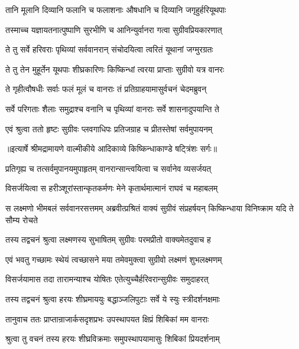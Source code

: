 \twolineshloka
{तानि मूलानि दिव्यानि फलानि च फलाशनाः}
{औषधानि च दिव्यानि जगृहुर्हरियूथपाः} %

\twolineshloka
{तस्माच्च यज्ञायतनात्पुष्पाणि सुरभीणि च}
{आनिन्युर्वानरा गत्वा सुग्रीवप्रियकारणात्} %

\twolineshloka
{ते तु सर्वे हरिवराः पृथिव्यां सर्ववानरान्}
{संचोदयित्वा त्वरितं यूथानां जग्मुरग्रतः} %

\twolineshloka
{ते तु तेन मुहूर्तेन यूथपाः शीघ्रकारिणः}
{किष्किन्धां त्वरया प्राप्ताः सुग्रीवो यत्र वानरः} %

\twolineshloka
{ते गृहीत्वौषधीः सर्वाः फलं मूलं च वानराः}
{तं प्रतिग्राहयामासुर्वचनं चेदमब्रुवन्} %

\twolineshloka
{सर्वे परिगताः शैलाः समुद्राश्च वनानि च}
{पृथिव्यां वानराः सर्वे शासनादुपयान्ति ते} %

\twolineshloka
{एवं श्रुत्वा ततो हृष्टः सुग्रीवः प्लवगाधिपः}
{प्रतिजग्राह च प्रीतस्तेषां सर्वमुपायनम्} %


{॥इत्यार्षे श्रीमद्रामायणे वाल्मीकीये आदिकाव्ये किष्किन्धाकाण्डे षट्त्रिंशः सर्गः॥}


\twolineshloka
{प्रतिगृह्य च तत्सर्वमुपानयमुपाहृतम्}
{वानरान्सान्त्वयित्वा च सर्वानेव व्यसर्जयत्} %

\twolineshloka
{विसर्जयित्वा स हरीञ्शूरांस्तान्कृतकर्मणः}
{मेने कृतार्थमात्मानं राघवं च महाबलम्} %

\threelineshloka
{स लक्ष्मणो भीमबलं सर्ववानरसत्तमम्}
{अब्रवीत्प्रश्रितं वाक्यं सुग्रीवं संप्रहर्षयन्}
{किष्किन्धाया विनिष्क्राम यदि ते सौम्य रोचते} %

\twolineshloka
{तस्य तद्वचनं श्रुत्वा लक्ष्मणस्य सुभाषितम्}
{सुग्रीवः परमप्रीतो वाक्यमेतदुवाच ह} %

\twolineshloka
{एवं भवतु गच्छामः स्थेयं त्वच्छासने मया}
{तमेवमुक्त्वा सुग्रीवो लक्ष्मणं शुभलक्ष्मणम्} %

\twolineshloka
{विसर्जयामास तदा तारामन्याश्च योषितः}
{एतेत्युच्चैर्हरिवरान्सुग्रीवः समुदाहरत्} %

\twolineshloka
{तस्य तद्वचनं श्रुत्वा हरयः शीघ्रमाययुः}
{बद्धाञ्जलिपुटाः सर्वे ये स्युः स्त्रीदर्शनक्षमाः} %

\twolineshloka
{तानुवाच ततः प्राप्तान्राजार्कसदृशप्रभः}
{उपस्थापयत क्षिप्रं शिबिकां मम वानराः} %

\twolineshloka
{श्रुत्वा तु वचनं तस्य हरयः शीघ्रविक्रमाः}
{समुपस्थापयामासुः शिबिकां प्रियदर्शनाम्} %

